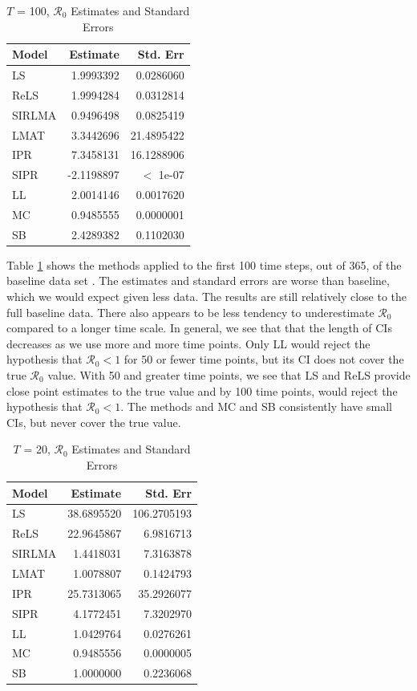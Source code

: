 \documentclass[12pt]{article}
\newcommand{\rr}{\ensuremath{\mathcal{R}_0}}
\begin{document}
\begin{table}[H]
	

	\centering
	\begin{tabular}[t]{l|r|r}
		\hline
		Model & Estimate & Std. Err\\
		\hline
		LS & 1.9993392 & 0.0286060\\
		\hline
		ReLS & 1.9994284 & 0.0312814\\
		\hline
		SIRLMA & 0.9496498 & 0.0825419\\
		\hline
		LMAT & 3.3442696 & 21.4895422\\
		\hline
		IPR & 7.3458131 & 16.1288906\\
		\hline
		SIPR & -2.1198897 & $<$ 1e-07\\
		\hline
		LL & 2.0014146 & 0.0017620\\
		\hline
		MC & 0.9485555 & 0.0000001\\
		\hline
		SB & 2.4289382 & 0.1102030\\
		\hline
	\end{tabular}
        \caption{ $T$ = 100, $\rr$ Estimates and Standard Errors}\label{tab:time-res1}
\end{table}

Table \ref{tab:time-res1} shows the methods applied to the first 100 time steps, out of 365, of the baseline data set . The estimates and standard errors are worse than baseline, which we would expect given less data. The results are still relatively close to the full baseline data. There also appears to be less tendency to underestimate $\rr$ compared to a longer time scale.  In general, we see that that the length of CIs decreases as we use more and more time points.  Only LL would reject the hypothesis that $\rr < 1$ for 50 or fewer time points, but its CI does not cover the true $\rr$ value.  With 50 and greater time points, we see that LS and ReLS provide close point estimates to the true value and by 100 time points, would reject the hypothesis that $\rr < 1$.  The methods and MC and SB consistently have small CIs, but never cover the true value.

\begin{table}[H]
  \centering
	\begin{tabular}[t]{l|r|r}
		\hline
		Model & Estimate & Std. Err\\
		\hline
		LS & 38.6895520 & 106.2705193\\
		\hline
		ReLS & 22.9645867 & 6.9816713\\
		\hline
		SIRLMA & 1.4418031 & 7.3163878\\
		\hline
		LMAT & 1.0078807 & 0.1424793\\
		\hline
		IPR & 25.7313065 & 35.2926077\\
		\hline
		SIPR & 4.1772451 & 7.3202970\\
		\hline
		LL & 1.0429764 & 0.0276261\\
		\hline
		MC & 0.9485556 & 0.0000005\\
		\hline
		SB & 1.0000000 & 0.2236068\\
		\hline
	\end{tabular}
        \caption{ $T$ = 20, $\rr$ Estimates and Standard Errors}\label{tab:time-res2}
\end{table}
\end{document}
